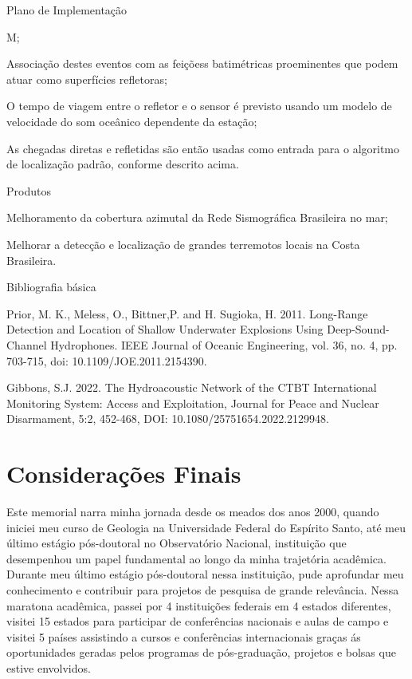 \documentclass[10pt,a4paper,oneside]{book}
\begin{document}
\begin{fancyenum}{\faBrain}{Plano de Implementação}
	\item M;
	\item Associação destes eventos com as feiçõess batimétricas proeminentes que podem atuar como superfícies refletoras;
	\item O tempo de viagem entre o refletor e o sensor é previsto usando um modelo de velocidade do som oceânico dependente da estação;
	\item As chegadas diretas e refletidas são então usadas como entrada para o algoritmo de localização padrão, conforme descrito acima.
\end{fancyenum}

\begin{fancyenum}{\faShoppingCart}{Produtos}
	\item Melhoramento da cobertura azimutal da Rede Sismográfica Brasileira no mar;
	\item Melhorar a detecção e localização de grandes terremotos locais na Costa Brasileira.
\end{fancyenum}

\begin{fancyenum}{\faBook}{Bibliografia básica}
	\item Prior, M. K., Meless, O., Bittner,P. and H. Sugioka, H. 2011. Long-Range Detection and Location of Shallow Underwater Explosions Using Deep-Sound-Channel Hydrophones. IEEE Journal of Oceanic Engineering, vol. 36, no. 4, pp. 703-715, doi: 10.1109/JOE.2011.2154390.
	\item Gibbons, S.J. 2022. The Hydroacoustic Network of the CTBT International Monitoring System: Access and Exploitation, Journal for Peace and Nuclear Disarmament, 5:2, 452-468, DOI: 10.1080/25751654.2022.2129948.
\end{fancyenum}


\chapter{Considerações Finais}
\label{cap_conclusao}

Este memorial narra minha jornada desde os meados dos anos 2000, quando iniciei meu curso de Geologia na Universidade Federal do Espírito Santo, até meu último estágio pós-doutoral no Observatório Nacional, instituição que desempenhou um papel fundamental ao longo da minha trajetória acadêmica. Durante meu último estágio pós-doutoral nessa instituição, pude aprofundar meu conhecimento e contribuir para projetos de pesquisa de grande relevância. Nessa maratona acadêmica, passei por 4 instituições federais em 4 estados diferentes, visitei 15 estados para participar de conferências nacionais e aulas de campo e visitei 5 países assistindo a cursos e conferências internacionais graças ás oportunidades geradas pelos programas de pós-graduação, projetos e bolsas que estive envolvidos.
\end{document}
